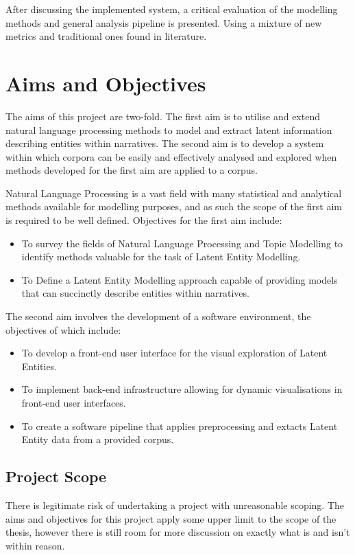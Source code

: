 \documentclass[10pt]{report}
\begin{document}
After discussing the implemented system, a critical evaluation of the modelling methods and general analysis pipeline is presented. Using a mixture of new metrics and traditional ones found in literature.

\section{Aims and Objectives}
The aims of this project are two-fold. The first aim is to utilise and extend natural language processing methods to model and extract latent information describing entities within narratives. The second aim is to develop a system within which corpora can be easily and effectively analysed and explored when methods developed for the first aim are applied to a corpus.

Natural Language Processing is a vast field with many statistical and analytical methods available for modelling purposes, and as such the scope of the first aim is required to be well defined. Objectives for the first aim include:

\renewcommand{\baselinestretch}{1.0}\normalsize
\begin{itemize}
\item To survey the fields of Natural Language Processing and Topic Modelling to identify methods valuable for the task of Latent Entity Modelling.
\item To Define a Latent Entity Modelling approach capable of providing models that can succinctly describe entities within narratives.
\end{itemize}

The second aim involves the development of a software environment, the objectives of which include:
\begin{itemize}
\item To develop a front-end user interface for the visual exploration of Latent Entities.  
\item To implement back-end infrastructure allowing for dynamic visualisations in front-end user interfaces.
  \item To create a software pipeline that applies preprocessing and extacts Latent Entity data from a provided corpus.
\end{itemize}
\renewcommand{\baselinestretch}{2.0}\normalsize

\subsection{Project Scope}
There is legitimate risk of undertaking a project with unreasonable scoping. The aims and objectives for this project apply some upper limit to the scope of the thesis, however there is still room for more discussion on exactly what is and isn't within reason.
\end{document}
